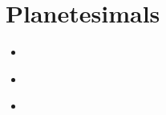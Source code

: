 \section{Planetesimals}

\begin{small}
\begin{itemize}
\item[\twothousandfourteen]
\item[\twothousandnineteen]
 \\
\item[\twothousandtwentyone]
\end{itemize}
\end{small}


